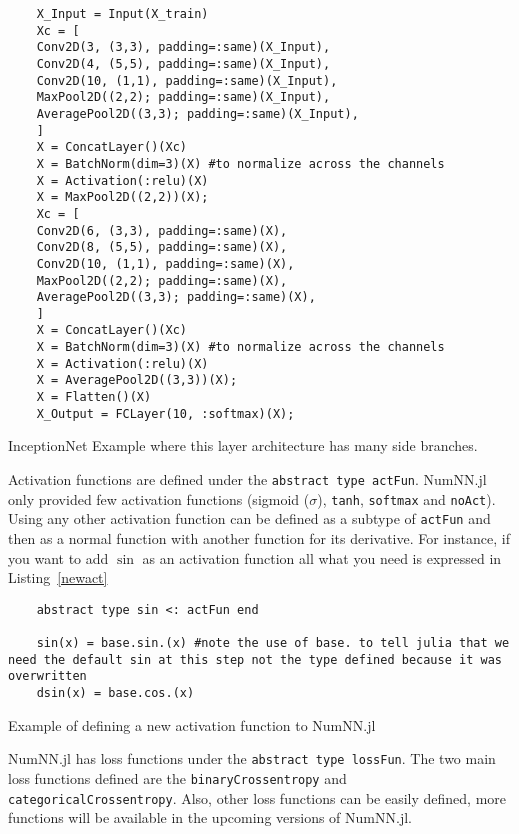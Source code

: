 \begin{listing}[!h]
	\begin{verbatim}
	X_Input = Input(X_train)
	Xc = [
	Conv2D(3, (3,3), padding=:same)(X_Input),
	Conv2D(4, (5,5), padding=:same)(X_Input),
	Conv2D(10, (1,1), padding=:same)(X_Input),
	MaxPool2D((2,2); padding=:same)(X_Input),
	AveragePool2D((3,3); padding=:same)(X_Input),
	]
	X = ConcatLayer()(Xc)
	X = BatchNorm(dim=3)(X) #to normalize across the channels
	X = Activation(:relu)(X)
	X = MaxPool2D((2,2))(X);
	Xc = [
	Conv2D(6, (3,3), padding=:same)(X),
	Conv2D(8, (5,5), padding=:same)(X),
	Conv2D(10, (1,1), padding=:same)(X),
	MaxPool2D((2,2); padding=:same)(X),
	AveragePool2D((3,3); padding=:same)(X),
	]
	X = ConcatLayer()(Xc)
	X = BatchNorm(dim=3)(X) #to normalize across the channels
	X = Activation(:relu)(X)
	X = AveragePool2D((3,3))(X);
	X = Flatten()(X)
	X_Output = FCLayer(10, :softmax)(X);
	\end{verbatim}
	\caption{InceptionNet Example where this layer architecture has many side branches.}\label{chain}
\end{listing}

Activation functions are defined under the \texttt{abstract type actFun}. NumNN.jl only provided few activation functions (sigmoid ($\sigma$), \texttt{tanh}, \texttt{softmax} and \texttt{noAct}). Using any other activation function can be defined as a subtype of \texttt{actFun} and then as a normal function with another function for its derivative. For instance, if you want to add $\sin$ as an activation function all what you need is expressed in Listing~\ref{newact}

\begin{listing}[H]
	\begin{verbatim}
	abstract type sin <: actFun end
	
	sin(x) = base.sin.(x) #note the use of base. to tell julia that we need the default sin at this step not the type defined because it was overwritten
	dsin(x) = base.cos.(x)
	\end{verbatim}
	\caption{Example of defining a new activation function to NumNN.jl}\label{newact}
\end{listing}

NumNN.jl has loss functions under the \texttt{abstract type lossFun}. The two main loss functions defined are the \texttt{binaryCrossentropy} and \texttt{categoricalCrossentropy}. Also, other loss functions can be easily defined, more functions will be available in the upcoming versions of NumNN.jl.



